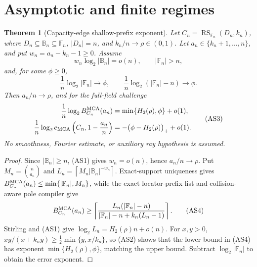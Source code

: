 \documentclass[11pt,a4paper]{amsart}
\numberwithin{equation}{section}
\newtheorem{theorem}{Theorem}[section]
\theoremstyle{remark}
\DeclareMathOperator{\RS}{RS}
\newcommand{\F}{\mathbb F}
\newcommand{\B}{\mathbb B}
\newcommand{\abs}[1]{\lvert #1\rvert}
\newcommand{\ceil}[1]{\left\lceil #1\right\rceil}
\begin{document}
\section{Asymptotic and finite regimes}\label{sec:complementary}


\begin{theorem}[Capacity-edge shallow-prefix exponent]
\label{thm:unconditional-asymptotic-rs-mca}
Let \(C_n=\RS_{\F_n}(D_n,k_n)\), where
\(D_n\subseteq\B_n\subseteq\F_n\), \(\abs{D_n}=n\), and
\(k_n/n\to\rho\in(0,1)\).  Let
\(a_n\in\{k_n+1,\ldots,n\}\), and put
\(w_n=a_n-k_n-1\ge0\).  Assume
\[
 w_n\log_2\abs{\B_n}=o(n),\qquad \abs{\F_n}>n,     \tag{AS1}
\]
and, for some \(\phi\ge0\),
\[
 \frac1n\log_2\abs{\F_n}\to\phi,\qquad
 \frac1n\log_2(\abs{\F_n}-n)\to\phi.              \tag{AS2}
\]
Then \(a_n/n\to\rho\), and for the full-field challenge
\[
 \begin{aligned}
 \frac1n\log_2 B_{C_n}^{\rm MCA}(a_n)
   &=\min\{H_2(\rho),\phi\}+o(1),\\
 \frac1n\log_2 e_{\rm MCA}
 \left(C_n,1-\frac{a_n}{n}\right)
   &=-\bigl(\phi-H_2(\rho)\bigr)_++o(1).
 \end{aligned}                                    \tag{AS3}
\]
No smoothness, Fourier estimate, or auxiliary ray hypothesis is assumed.
\end{theorem}

\begin{proof}
Since \(\abs{\B_n}\ge n\), \textup{(AS1)} gives \(w_n=o(n)\), hence
\(a_n/n\to\rho\).  Put
\(M_n=\binom n{a_n}\) and
\(L_n=\ceil{M_n\abs{\B_n}^{-w_n}}\).
Exact-support uniqueness gives
\(B_{C_n}^{\rm MCA}(a_n)\le\min\{\abs{\F_n},M_n\}\), while the exact
locator-prefix list and collision-aware pole compiler give
\[
 B_{C_n}^{\rm MCA}(a_n)\ge
 \left\lceil\frac{L_n(\abs{\F_n}-n)}
 {\abs{\F_n}-n+k_n(L_n-1)}\right\rceil.           \tag{AS4}
\]
Stirling and \textup{(AS1)} give
\(\log_2L_n=H_2(\rho)n+o(n)\).  For \(x,y>0\),
\(xy/(x+k_ny)\ge\frac12\min\{y,x/k_n\}\), so
\textup{(AS2)} shows that the lower bound in \textup{(AS4)} has exponent
\(\min\{H_2(\rho),\phi\}\), matching the upper bound.  Subtract
\(\log_2\abs{\F_n}\) to obtain the error exponent.
\end{proof}
\end{document}
